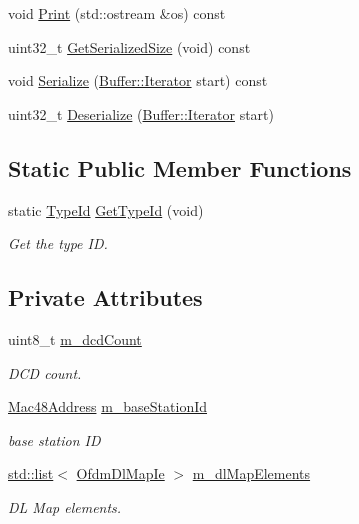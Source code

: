 \begin{DoxyCompactItemize}
\item 
void \hyperlink{classns3_1_1DlMap_af3daadc4f5d436bec950d1be2bb86415}{Print} (std\+::ostream \&os) const 
\item 
uint32\+\_\+t \hyperlink{classns3_1_1DlMap_ae4361013a9e68a9aa319fa7559717ab3}{Get\+Serialized\+Size} (void) const 
\item 
void \hyperlink{classns3_1_1DlMap_a2634be463a3e4d4bb19904a20aa97f32}{Serialize} (\hyperlink{classns3_1_1Buffer_1_1Iterator}{Buffer\+::\+Iterator} start) const 
\item 
uint32\+\_\+t \hyperlink{classns3_1_1DlMap_a32304809baa42509928e641226100b98}{Deserialize} (\hyperlink{classns3_1_1Buffer_1_1Iterator}{Buffer\+::\+Iterator} start)
\end{DoxyCompactItemize}
\subsection*{Static Public Member Functions}
\begin{DoxyCompactItemize}
\item 
static \hyperlink{classns3_1_1TypeId}{Type\+Id} \hyperlink{classns3_1_1DlMap_a70bb05f7863a4bbf66c378ffacffdae6}{Get\+Type\+Id} (void)
\begin{DoxyCompactList}\small\item\em Get the type ID. \end{DoxyCompactList}\end{DoxyCompactItemize}
\subsection*{Private Attributes}
\begin{DoxyCompactItemize}
\item 
uint8\+\_\+t \hyperlink{classns3_1_1DlMap_a631acfeb23dc7ce671cc115045d93d46}{m\+\_\+dcd\+Count}
\begin{DoxyCompactList}\small\item\em D\+CD count. \end{DoxyCompactList}\item 
\hyperlink{classns3_1_1Mac48Address}{Mac48\+Address} \hyperlink{classns3_1_1DlMap_ad5d3b24b4d6cc443d13914c16240ab35}{m\+\_\+base\+Station\+Id}
\begin{DoxyCompactList}\small\item\em base station ID \end{DoxyCompactList}\item 
\hyperlink{openflow-interface_8h_afd9bcfa176617760671b67580f536fa7}{std\+::list}$<$ \hyperlink{classns3_1_1OfdmDlMapIe}{Ofdm\+Dl\+Map\+Ie} $>$ \hyperlink{classns3_1_1DlMap_a40f1f91916deac28501881ac057ecfab}{m\+\_\+dl\+Map\+Elements}
\begin{DoxyCompactList}\small\item\em DL Map elements. \end{DoxyCompactList}\end{DoxyCompactItemize}
